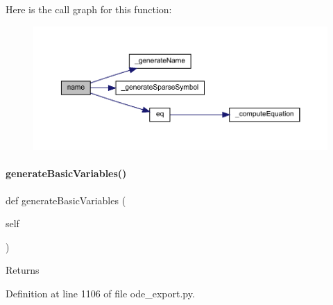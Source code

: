 Here is the call graph for this function\+:
\nopagebreak
\begin{figure}[H]
\begin{center}
\leavevmode
\includegraphics[width=350pt]{classamici_1_1ode__export_1_1_o_d_e_model_a4d110acf8e52c4d48044071ea06952c0_cgraph}
\end{center}
\end{figure}
\mbox{\label{classamici_1_1ode__export_1_1_o_d_e_model_af3b774d51a546704413dc57f93dc427d}} 
\paragraph{\texorpdfstring{generate\+Basic\+Variables()}{generateBasicVariables()}}
{\footnotesize\ttfamily def generate\+Basic\+Variables (\begin{DoxyParamCaption}\item[{}]{self }\end{DoxyParamCaption})}

\begin{DoxyReturn}{Returns}

\end{DoxyReturn}


Definition at line 1106 of file ode\+\_\+export.\+py.

